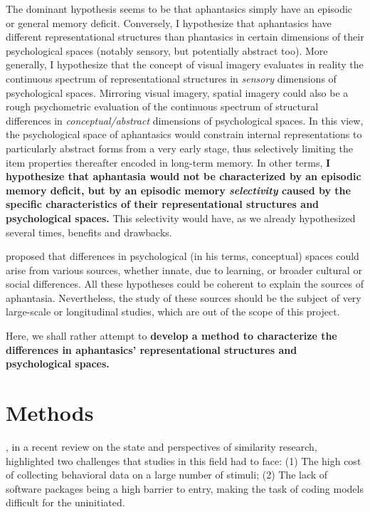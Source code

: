 \documentclass[
  authoryear]{elsarticle}
\begin{document}
The dominant hypothesis seems to be that aphantasics simply have an
episodic or general memory deficit. Conversely, I hypothesize that
aphantasics have different representational structures than phantasics
in certain dimensions of their psychological spaces (notably sensory,
but potentially abstract too). More generally, I hypothesize that the
concept of visual imagery evaluates in reality the continuous spectrum
of representational structures in \emph{sensory} dimensions of
psychological spaces. Mirroring visual imagery, spatial imagery could
also be a rough psychometric evaluation of the continuous spectrum of
structural differences in \emph{conceptual/abstract} dimensions of
psychological spaces. In this view, the psychological space of
aphantasics would constrain internal representations to particularly
abstract forms from a very early stage, thus selectively limiting the
item properties thereafter encoded in long-term memory. In other terms,
\textbf{I hypothesize that aphantasia would not be characterized by an
episodic memory deficit, but by an episodic memory \emph{selectivity}
caused by the specific characteristics of their representational
structures and psychological spaces.} This selectivity would have, as we
already hypothesized several times, benefits and drawbacks.

\citet{gardenforsConceptualSpacesFramework2004} proposed that
differences in psychological (in his terms, conceptual) spaces could
arise from various sources, whether innate, due to learning, or broader
cultural or social differences. All these hypotheses could be coherent
to explain the sources of aphantasia. Nevertheless, the study of these
sources should be the subject of very large-scale or longitudinal
studies, which are out of the scope of this project.

Here, we shall rather attempt to \textbf{develop a method to
characterize the differences in aphantasics' representational structures
and psychological spaces.}

\section{Methods}\label{methods}

\citet{roads2024}, in a recent review on the state and perspectives of
similarity research, highlighted two challenges that studies in this
field had to face: (1) The high cost of collecting behavioral data on a
large number of stimuli; (2) The lack of software packages being a high
barrier to entry, making the task of coding models difficult for the
uninitiated.
\end{document}
